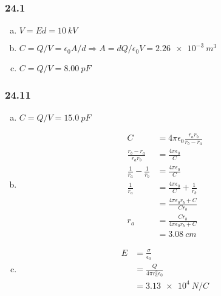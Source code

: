 \documentclass{article}
\begin{document}
\subsubsection{24.1}

\begin{enumerate}[(a)]
  \item $V = E d = \qty{10}{kV}$

  \item $C = Q / V = \epsilon_0 A / d \Rightarrow A = d Q / \epsilon_0 V = \qty{2.26e-3}{m^3}$

  \item $C = Q / V = \qty{8.00}{pF}$
\end{enumerate}

\subsubsection{24.11}

\begin{enumerate}[(a)]
  \item $C = Q / V = \qty{15.0}{pF}$

  \item

        \begin{align*}
          C                             & = 4 \pi \epsilon_0 \frac{r_a r_b}{r_b - r_a} \\
          \frac{r_b - r_a}{r_a r_b}     & = \frac{4 \pi \epsilon_0}{C}                 \\
          \frac{1}{r_a} - \frac{1}{r_b} & = \frac{4 \pi \epsilon_0}{C}                 \\
          \frac{1}{r_a}                 & = \frac{4 \pi \epsilon_0}{C} + \frac{1}{r_b} \\
                                        & = \frac{4 \pi \epsilon_0 r_b + C}{C r_b}     \\
          r_a                           & = \frac{C r_b}{4 \pi \epsilon_0 r_b + C}     \\
                                        & = \qty{3.08}{cm}
        \end{align*}

  \item

        \begin{align*}
          E & = \frac{\sigma}{\epsilon_0}        \\
            & = \frac{Q}{4 \pi r_a^2 \epsilon_0} \\
            & = \qty{3.13e4}{N/C}
        \end{align*}
\end{enumerate}
\end{document}
